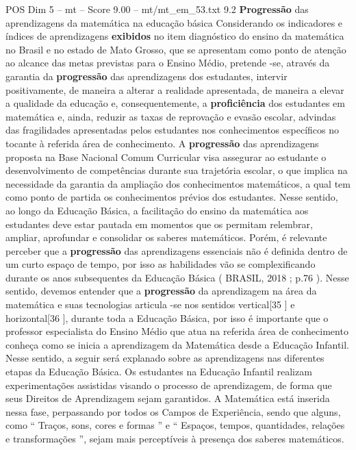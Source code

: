 \begin{textsample}{POS Dim 5 – mt – Score 9.00 – mt/mt\_em\_53.txt}  \label{ex:f5_pos_085}
9.2 \textbf{Progressão} das aprendizagens da matemática na educação básica Considerando os indicadores e índices de aprendizagens \textbf{exibidos} no item diagnóstico do ensino da matemática no Brasil e no estado de Mato Grosso, que se apresentam como ponto de atenção ao alcance das metas previstas para o Ensino Médio, pretende -se, através da garantia da \textbf{progressão} das aprendizagens dos estudantes, intervir positivamente, de maneira a alterar a realidade apresentada, de maneira a elevar a qualidade da educação e, consequentemente, a \textbf{proficiência} dos estudantes em matemática e, ainda, reduzir as taxas de reprovação e evasão escolar, advindas das fragilidades apresentadas pelos estudantes nos conhecimentos específicos no tocante à referida área de conhecimento.
A \textbf{progressão} das aprendizagens proposta na Base Nacional Comum Curricular visa assegurar ao estudante o desenvolvimento de competências durante sua trajetória escolar, o que implica na necessidade da garantia da ampliação dos conhecimentos matemáticos, a qual tem como ponto de partida os conhecimentos prévios dos estudantes.
Nesse sentido, ao longo da Educação Básica, a facilitação do ensino da matemática aos estudantes deve estar pautada em momentos que os permitam relembrar, ampliar, aprofundar e consolidar os saberes matemáticos.
Porém, é relevante perceber que a \textbf{progressão} das aprendizagens essenciais não é definida dentro de um curto espaço de tempo, por isso as habilidades vão se complexificando durante os anos subsequentes da Educação Básica ( BRASIL, 2018 ; p.76 ).
Nesse sentido, devemos entender que a \textbf{progressão} da aprendizagem na área da matemática e suas tecnologias articula -se nos sentidos vertical[35 ] e horizontal[36 ], durante toda a Educação Básica, por isso é importante que o professor especialista do Ensino Médio que atua na referida área de conhecimento conheça como se inicia a aprendizagem da Matemática desde a Educação Infantil.
Nesse sentido, a seguir será explanado sobre as aprendizagens nas diferentes etapas da Educação Básica.
Os estudantes na Educação Infantil realizam experimentações assistidas visando o processo de aprendizagem, de forma que seus Direitos de Aprendizagem sejam garantidos.
A Matemática está inserida nessa fase, perpassando por todos os Campos de Experiência, sendo que alguns, como “ Traços, sons, cores e formas ” e “ Espaços, tempos, quantidades, relações e transformações ”, sejam mais perceptíveis à presença dos saberes matemáticos.

\end{textsample}
